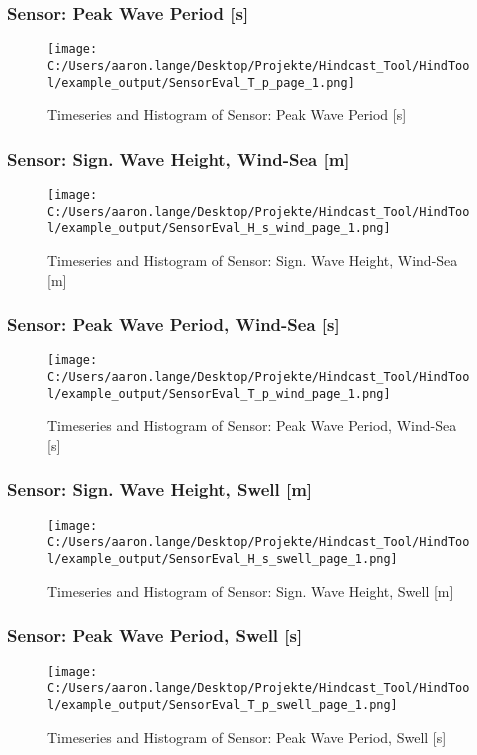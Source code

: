 \subsubsection{Sensor: Peak Wave Period [s]} 
\begin{figure}[H] 
 \centering 
 \texttt{[image: C:/Users/aaron.lange/Desktop/Projekte/Hindcast\_Tool/HindTool/example\_output/SensorEval\_T\_p\_page\_1.png]} 
 \caption{ Timeseries and Histogram of Sensor: Peak Wave Period [s] } 
 \label{fig: SensorEval_T_p_page_1 } 
\end{figure}
 \clearpage
\subsubsection{Sensor: Sign. Wave Height, Wind-Sea [m]} 
\begin{figure}[H] 
 \centering 
 \texttt{[image: C:/Users/aaron.lange/Desktop/Projekte/Hindcast\_Tool/HindTool/example\_output/SensorEval\_H\_s\_wind\_page\_1.png]} 
 \caption{ Timeseries and Histogram of Sensor: Sign. Wave Height, Wind-Sea [m] } 
 \label{fig: SensorEval_H_s_wind_page_1 } 
\end{figure}
 \clearpage
\subsubsection{Sensor: Peak Wave Period, Wind-Sea [s]} 
\begin{figure}[H] 
 \centering 
 \texttt{[image: C:/Users/aaron.lange/Desktop/Projekte/Hindcast\_Tool/HindTool/example\_output/SensorEval\_T\_p\_wind\_page\_1.png]} 
 \caption{ Timeseries and Histogram of Sensor: Peak Wave Period, Wind-Sea [s] } 
 \label{fig: SensorEval_T_p_wind_page_1 } 
\end{figure}
 \clearpage
\subsubsection{Sensor: Sign. Wave Height, Swell [m]} 
\begin{figure}[H] 
 \centering 
 \texttt{[image: C:/Users/aaron.lange/Desktop/Projekte/Hindcast\_Tool/HindTool/example\_output/SensorEval\_H\_s\_swell\_page\_1.png]} 
 \caption{ Timeseries and Histogram of Sensor: Sign. Wave Height, Swell [m] } 
 \label{fig: SensorEval_H_s_swell_page_1 } 
\end{figure}
 \clearpage
\subsubsection{Sensor: Peak Wave Period, Swell [s]} 
\begin{figure}[H] 
 \centering 
 \texttt{[image: C:/Users/aaron.lange/Desktop/Projekte/Hindcast\_Tool/HindTool/example\_output/SensorEval\_T\_p\_swell\_page\_1.png]} 
 \caption{ Timeseries and Histogram of Sensor: Peak Wave Period, Swell [s] } 
 \label{fig: SensorEval_T_p_swell_page_1 } 
\end{figure}
 \clearpage
